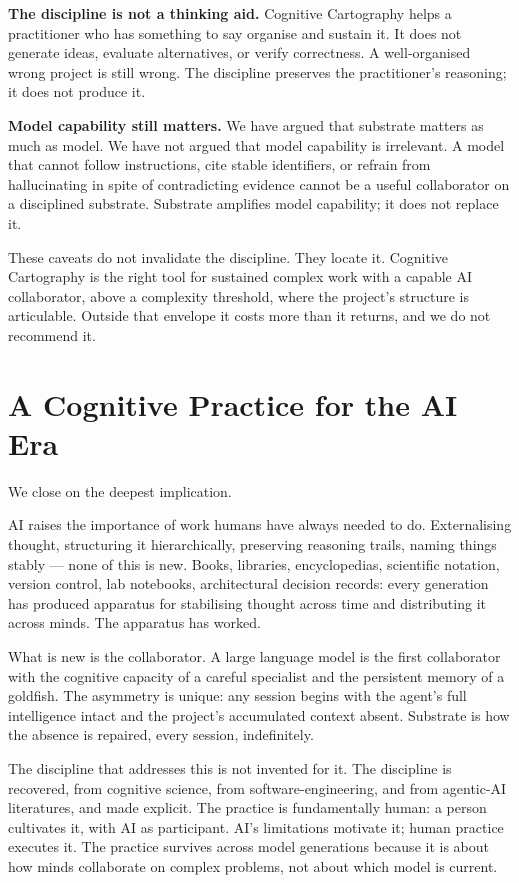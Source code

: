 \documentclass[11pt,a4paper,twocolumn]{article}
\begin{document}
\textbf{The discipline is not a thinking aid.} Cognitive
Cartography helps a practitioner who has something to say organise
and sustain it. It does not generate ideas, evaluate alternatives,
or verify correctness. A well-organised wrong project is still
wrong. The discipline preserves the practitioner's reasoning; it
does not produce it.

\textbf{Model capability still matters.} We have argued that
substrate matters as much as model. We have not argued that model
capability is irrelevant. A model that cannot follow instructions,
cite stable identifiers, or refrain from hallucinating in spite of
contradicting evidence cannot be a useful collaborator on a
disciplined substrate. Substrate amplifies model capability; it
does not replace it.

These caveats do not invalidate the discipline. They locate it.
Cognitive Cartography is the right tool for sustained complex
work with a capable AI collaborator, above a complexity threshold,
where the project's structure is articulable. Outside that
envelope it costs more than it returns, and we do not recommend
it.

\section{A Cognitive Practice for the AI Era}
\label{sec:close}

We close on the deepest implication.

AI raises the importance of work humans have always needed to do.
Externalising thought, structuring it hierarchically, preserving
reasoning trails, naming things stably --- none of this is new.
Books, libraries, encyclopedias, scientific notation, version
control, lab notebooks, architectural decision records: every
generation has produced apparatus for stabilising thought across
time and distributing it across minds. The apparatus has worked.

What is new is the collaborator. A large language model is the
first collaborator with the cognitive capacity of a careful
specialist and the persistent memory of a goldfish. The asymmetry
is unique: any session begins with the agent's full intelligence
intact and the project's accumulated context absent. Substrate is
how the absence is repaired, every session, indefinitely.

The discipline that addresses this is not invented for it. The
discipline is recovered, from cognitive science, from
software-engineering, and from agentic-AI literatures, and made
explicit. The practice is fundamentally human: a person cultivates
it, with AI as participant. AI's limitations motivate it; human
practice executes it. The practice survives across model
generations because it is about how minds collaborate on complex
problems, not about which model is current.
\end{document}
